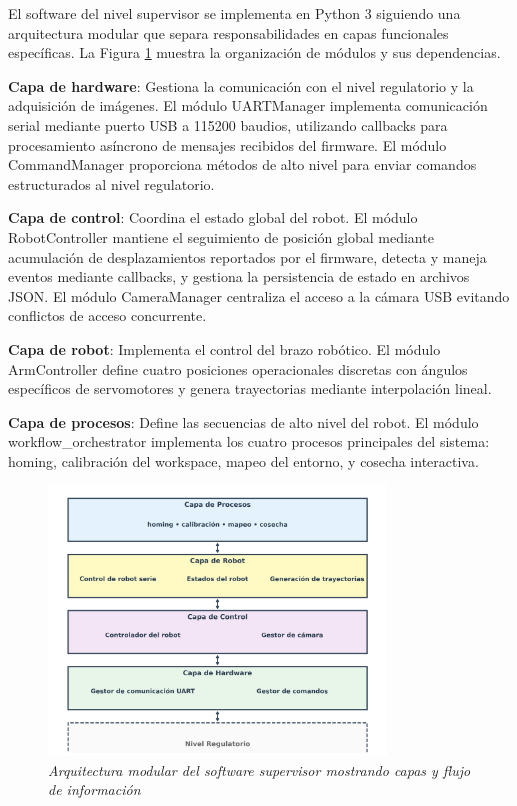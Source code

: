 El software del nivel supervisor se implementa en Python 3 siguiendo una arquitectura modular que separa responsabilidades en capas funcionales específicas. La Figura \ref{fig:arquitectura_modulos_supervisor} muestra la organización de módulos y sus dependencias.

\textbf{Capa de hardware}: Gestiona la comunicación con el nivel regulatorio y la adquisición de imágenes. El módulo UARTManager implementa comunicación serial mediante puerto USB a 115200 baudios, utilizando callbacks para procesamiento asíncrono de mensajes recibidos del firmware. El módulo CommandManager proporciona métodos de alto nivel para enviar comandos estructurados al nivel regulatorio.

\textbf{Capa de control}: Coordina el estado global del robot. El módulo RobotController mantiene el seguimiento de posición global mediante acumulación de desplazamientos reportados por el firmware, detecta y maneja eventos mediante callbacks, y gestiona la persistencia de estado en archivos JSON. El módulo CameraManager centraliza el acceso a la cámara USB evitando conflictos de acceso concurrente.

\textbf{Capa de robot}: Implementa el control del brazo robótico. El módulo ArmController define cuatro posiciones operacionales discretas con ángulos específicos de servomotores y genera trayectorias mediante interpolación lineal.

\textbf{Capa de procesos}: Define las secuencias de alto nivel del robot. El módulo workflow\_orchestrator implementa los cuatro procesos principales del sistema: homing, calibración del workspace, mapeo del entorno, y cosecha interactiva.

\begin{figure}[H]
    \centering
    \includegraphics[width=0.8\textwidth]{imagenes/arquitectura_modulos_supervisor.png}
    \caption{\textit{Arquitectura modular del software supervisor mostrando capas y flujo de información}}
    \label{fig:arquitectura_modulos_supervisor}
\end{figure}